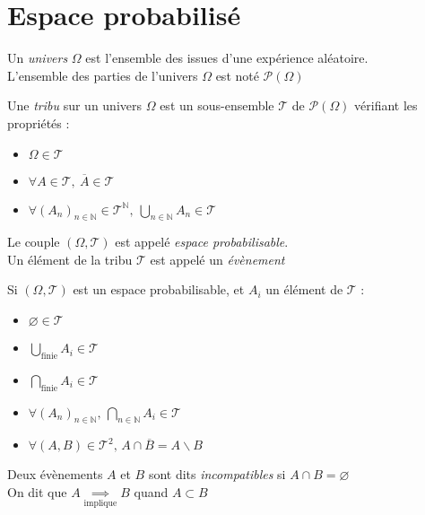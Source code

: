 \documentclass[11pt,a4paper,fleqn,pdftex]{report}
\begin{document}
\section{Espace probabilisé} %
\label{sec:espace_probabilise}
\begin{dfn}[Univers]
     Un \emph{univers} $\Omega$ est l'ensemble des issues d'une expérience aléatoire.\\
     L'ensemble des parties de l'univers $\Omega$ est noté $\mathcal{P}(\Omega{})$
\end{dfn}
\begin{dfn}
     Une \emph{tribu} sur un univers $\Omega$ est un sous-ensemble $\mathscr{T}$ de $\mathcal{P}(\Omega{})$ vérifiant les propriétés :
     \begin{itemize}
         \item $\Omega \in \mathscr{T}$
         \item $\forall A \in \mathscr{T},\: \overline{A} \in \mathscr{T}$
         \item $\forall \left( A_n \right)_{n\in \mathbb{N}} \in \mathscr{T}^\mathbb{N},\: \bigcup_{n\in \mathbb{N}} A_n \in \mathscr{T}$
     \end{itemize}
     Le couple $(\Omega, \mathscr{T})$ est appelé \emph{espace probabilisable}.\\
     Un élément de la tribu $\mathscr{T}$ est appelé un \emph{évènement}
\end{dfn}
\begin{prop}
     Si $(\Omega, \mathscr{T})$ est un espace probabilisable, et $A_i$ un élément de $\mathscr{T}$ :
     \begin{itemize}
         \item $\varnothing \in \mathscr{T}$
         \item $\bigcup_\text{finie} A_i \in \mathscr{T}$
         \item $\bigcap_\text{finie} A_i \in \mathscr{T}$
         \item $\forall (A_n)_{n\in \mathbb{N}},\, \bigcap_{n\in \mathbb{N}} A_i \in \mathscr{T}$
         \item $\forall (A,B) \in \mathscr{T}^2,\, A\cap \overline{B} = A \backslash B$
     \end{itemize}
\end{prop}
\begin{dfn}
     Deux évènements $A$ et $B$ sont dits \emph{incompatibles} si $A \cap B = \varnothing$\\
     On dit que $A \underset{\text{implique}}{\implies} B$ quand $A \subset B$
\end{dfn}
\end{document}
